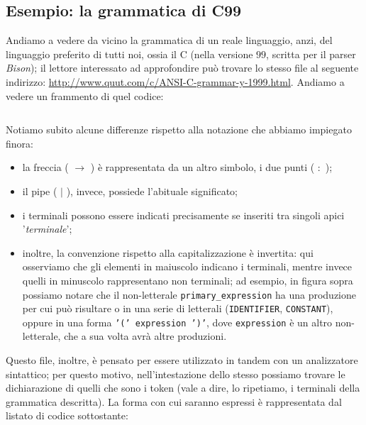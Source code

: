 \documentclass[class=book, crop=false, oneside, 12pt]{standalone}
\begin{document}
\subsection{Esempio: la grammatica di C99}
Andiamo a vedere da vicino la grammatica di un reale linguaggio, anzi, del linguaggio preferito di tutti noi, ossia il C (nella versione \(99\), scritta per il parser \emph{Bison}); il lettore interessato ad approfondire può trovare lo stesso file al seguente indirizzo: \url{http://www.quut.com/c/ANSI-C-grammar-y-1999.html}. Andiamo a vedere un frammento di quel codice:

\inputminted[firstline = 17, lastline = 22, linenos, breaklines, tabsize = 2]{c}{assets/resources/c99.y}

Notiamo subito alcune differenze rispetto alla notazione che abbiamo impiegato finora: 
\begin{itemize}
    \item la freccia ( \(\to\) ) è rappresentata da un altro simbolo, i due punti ( \(:\) );
    \item il pipe ( \(\mid\) ), invece, possiede l'abituale significato;
    \item i terminali possono essere indicati precisamente se inseriti tra singoli apici '\emph{terminale}';
    \item inoltre, la convenzione rispetto alla capitalizzazione è invertita: qui osserviamo che gli elementi in maiuscolo indicano i terminali, mentre invece quelli in minuscolo rappresentano non terminali; ad esempio, in figura sopra possiamo notare che il non-letterale \texttt{primary\_expression} ha una produzione per cui può risultare o in una serie di letterali (\texttt{IDENTIFIER}, \texttt{CONSTANT}), oppure in una forma \texttt{'(' expression ')'}, dove \texttt{expression} è un altro non-letterale, che a sua volta avrà altre produzioni.
\end{itemize}

Questo file, inoltre, è pensato per essere utilizzato in tandem con un analizzatore sintattico; per questo motivo, nell'intestazione dello stesso possiamo trovare le dichiarazione di quelli che sono i token (vale a dire, lo ripetiamo, i terminali della grammatica descritta). La forma con cui saranno espressi è rappresentata dal listato di codice sottostante:

\inputminted[lastline = 12, linenos, breaklines, tabsize = 2, fontsize = \small]{c}{assets/resources/c99.y}
\end{document}

